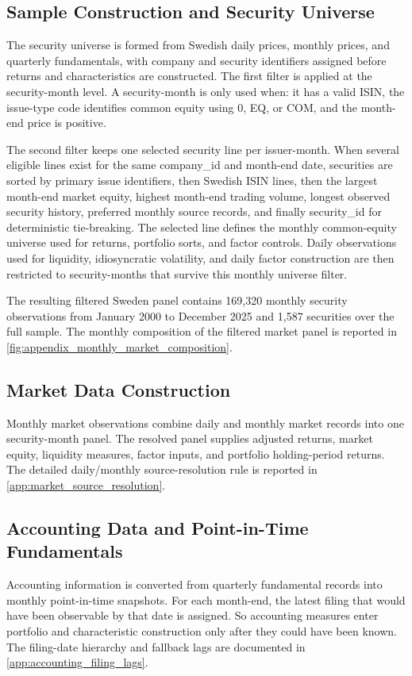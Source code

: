\documentclass[11pt]{article}
\newcommand{\repo}[1]{\textnormal{\small #1}}
\begin{document}
\subsection{Sample Construction and Security Universe}
The security universe is formed from Swedish daily prices, monthly prices, and quarterly fundamentals, with company and security identifiers assigned before returns and characteristics are constructed. The first filter is applied at the security-month level. A security-month is only used when: it has a valid ISIN, the issue-type code identifies common equity using \repo{0}, \repo{EQ}, or \repo{COM}, and the month-end price is  positive. 

The second filter keeps one selected security line per issuer-month. When several eligible lines exist for the same \repo{company\_id} and month-end date, securities are sorted by primary issue identifiers, then Swedish ISIN lines, then the largest month-end market equity, highest month-end trading volume, longest observed security history, preferred monthly source records, and finally \repo{security\_id} for deterministic tie-breaking. The selected line defines the monthly common-equity universe used for returns, portfolio sorts, and factor controls. Daily observations used for liquidity, idiosyncratic volatility, and daily factor construction are then restricted to security-months that survive this monthly universe filter.

The resulting filtered Sweden panel contains 169,320 monthly security observations from January 2000 to December 2025 and 1,587 securities over the full sample. The monthly composition of the filtered market panel is reported in \cref{fig:appendix_monthly_market_composition}.

\subsection{Market Data Construction}
Monthly market observations combine daily and monthly market records into one security-month panel. The resolved panel supplies adjusted returns, market equity, liquidity measures, factor inputs, and portfolio holding-period returns. The detailed daily/monthly source-resolution rule is reported in \cref{app:market_source_resolution}.

\subsection{Accounting Data and Point-in-Time Fundamentals}
Accounting information is converted from quarterly fundamental records into monthly point-in-time snapshots. For each month-end, the latest filing that would have been observable by that date is assigned. So accounting measures enter portfolio and characteristic construction only after they could have been known. The filing-date hierarchy and fallback lags are documented in \cref{app:accounting_filing_lags}.
\end{document}
